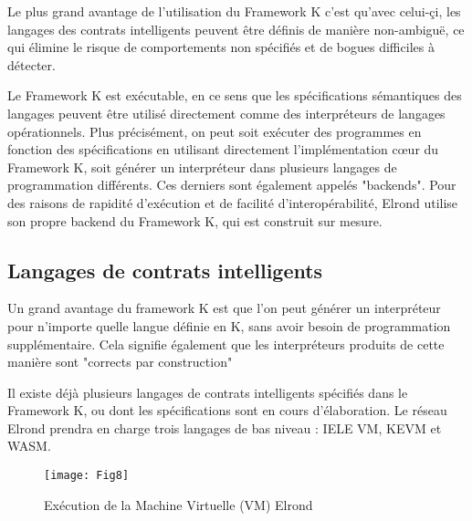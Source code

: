 \documentclass[journal]{IEEEtran}
\begin{document}
Le plus grand avantage de l'utilisation du Framework K c'est qu'avec celui-çi, les langages des contrats intelligents peuvent être définis de manière non-ambiguë, ce qui élimine le risque de comportements non spécifiés et de bogues difficiles à détecter.

Le Framework K est exécutable, en ce sens que les spécifications sémantiques des langages peuvent être utilisé directement comme des interpréteurs de langages opérationnels. Plus précisément, on peut soit exécuter des programmes en fonction des spécifications en utilisant directement l'implémentation cœur du Framework K, soit générer un interpréteur dans plusieurs langages de programmation différents. Ces derniers sont également appelés "backends". Pour des raisons de rapidité d'exécution et de facilité d'interopérabilité, Elrond utilise son propre backend du Framework K, qui est construit sur mesure.

\subsection{Langages de contrats intelligents}
Un grand avantage du framework K est que l'on peut générer un interpréteur pour n'importe quelle langue définie en K, sans avoir besoin de programmation supplémentaire. Cela signifie également que les interpréteurs produits de cette manière sont "corrects par construction"

Il existe déjà plusieurs langages de contrats intelligents spécifiés dans le Framework K, ou dont les spécifications sont en cours d'élaboration. Le réseau Elrond prendra en charge trois langages de bas niveau : IELE VM, KEVM et WASM.

 \begin{figure}[h]
	\texttt{[image: Fig8]} %
	\caption{Exécution de la Machine Virtuelle (VM) Elrond} %
	\label{Fig.8} %
\end{figure}
\end{document}
